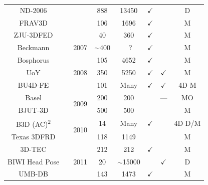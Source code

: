 \begin{table}[h]
{\begin{tabular}{@{}cccccccc@{}}
ND-2006                     &\cite{faltemier2007using}      &                       & 888         & 13450       & $\checkmark$ &              & D      \\
FRAV3D                      &\cite{conde2006multimodal}     &                       & 106         & 1696        & $\checkmark$ &              & M      \\
ZJU-3DFED                   &\cite{wang2006exploring}       &                       & 40          & 360         & $\checkmark$ &              & M      \\ \midrule
Beckmann                    &\cite{hu2007building}          & 2007                  & $\sim$400   &~?           & $\checkmark$ &              & M      \\ \midrule
Bosphorus                   &\cite{Savran:2008gg}           & \multirow{3}{*}{2008} & 105         & 4652        & $\checkmark$ &              & M      \\
UoY                         &\cite{heseltine2008three}      &                       & 350         & 5250        & $\checkmark$ & $\checkmark$ & M      \\
BU4D-FE                     &\cite{yin2008high}             &                       & 101         & Many        & $\checkmark$ & $\checkmark$ & 4D M   \\ \midrule
Basel                       &\cite{paysan20093d}            & \multirow{2}{*}{2009} & 200         & 200         &              & ---          & MO     \\
BJUT-3D                     &\cite{baocai2009bjut}          &                       & 500         & 500         &              &              & M      \\ \midrule
B3D (AC)\textsuperscript{2} &\cite{fanelli20103}            & \multirow{2}{*}{2010} & 14          & Many        & $\checkmark$ &              & 4D D/M \\
Texas 3DFRD                 &\cite{gupta2010anthropometric} &                       & 118         & 1149        &              &              & M      \\ \midrule
3D-TEC                      &\cite{vijayan2011twins}        & \multirow{3}{*}{2011} & 212         & 212         & $\checkmark$ &              & M      \\
BIWI Head Pose              &\cite{fanelli2013random}       &                       & 20          & $\sim$15000 &              & $\checkmark$ & D      \\
UMB-DB                      &\cite{colombo2011umb}          &                       & 143         & 1473        & $\checkmark$ &              & M      \\ \midrule

\end{tabular}}
\end{table}
